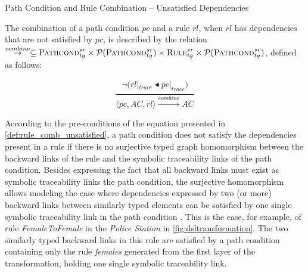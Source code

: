 \begin{definition}{Path Condition and Rule Combination -- Unsatisfied Dependencies\\} 
\label{def:rule_comb_unsatisfied}
% 



The combination of a path condition $pc$ and a rule $rl$, when $rl$ has dependencies that are not satisfied by $pc$, is described by the relation $\stackrel{combine}{\rightarrow}\subseteq \textsc{Pathcond}^{sr}_{tg}\times \mathcal{P}(\textsc{Pathcond}^{sr}_{tg})\\ \times \textsc{Rule}^{sr}_{tg} \times \mathcal{P}(\textsc{Pathcond}^{sr}_{tg})$, defined as follows:	


$$\frac{\begin{array}{ll}\neg\big(rl|_{trace}\blacktriangleleft pc|_{trace}\big) \end{array}}
{\langle pc,AC,rl\rangle \xrightarrow{combine} AC}$$

\end{definition}

According to the pre-conditions of the equation presented in \cref{def:rule_comb_unsatisfied}, a path condition does not satisfy the dependencies present in a rule if there is no surjective typed graph homomorphism between the backward links of the rule and the symbolic traceability links of the path condition. Besides expressing the fact that all backward links must exist as symbolic traceability links the path condition, the surjective homomorphism allows modeling the case where dependencies expressed by two (or more) backward links between similarly typed elements can be satisfied by one single symbolic traceability link in the path condition . This is the case, for example, of rule \emph{FemaleToFemale} in the \emph{Police Station} in \cref{fig:dsltransformation}. The two similarly typed backward links in this rule are satisfied by a path condition containing only the rule \emph{females} generated from the first layer of the transformation, holding one single symbolic traceability link.


